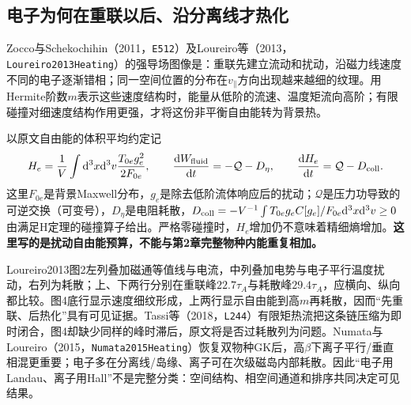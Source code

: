\subsection{电子为何在重联以后、沿分离线才热化}
Zocco与Schekochihin（2011，\texttt{E512}）及Loureiro等（2013，\texttt{Loureiro2013Heating}）的强导场图像是：重联先建立流动和扰动，沿磁力线速度不同的电子逐渐错相；同一空间位置的分布在$v_\parallel$方向出现越来越细的纹理。用Hermite阶数$m$表示这些速度结构时，能量从低阶的流速、温度矩流向高阶；有限碰撞对细速度结构作用更强，才将这份非平衡自由能转为背景热。\citep{E512,Loureiro2013Heating}

以原文自由能的体积平均约定记
\begin{equation}
H_e=\frac1V\int\mathrm d^3x\mathrm d^3v\frac{T_{0e}g_e^2}{2F_{0e}},\qquad
\frac{\mathrm d W_{\rm fluid}}{\mathrm d t}=-\mathcal Q-D_\eta,\qquad
\frac{\mathrm d H_e}{\mathrm d t}=\mathcal Q-D_{\rm coll}.
\end{equation}
这里$F_{0e}$是背景Maxwell分布，$g_e$是除去低阶流体响应后的扰动；$\mathcal Q$是压力功导致的可逆交换（可变号），$D_\eta$是电阻耗散，$D_{\rm coll}=-V^{-1}\int T_{0e}g_e C[g_e]/F_{0e}\mathrm d^3x\mathrm d^3v\geq0$由满足H定理的碰撞算子给出。严格零碰撞时，$H_e$增加仍不意味着精细熵增加。\textbf{这里写的是扰动自由能预算，不能与第2章完整物种内能重复相加。}

Loureiro2013图2左列叠加磁通等值线与电流，中列叠加电势与电子平行温度扰动，右列为耗散；上、下两行分别在重联峰$22.7\tau_A$与耗散峰$29.4\tau_A$，应横向、纵向都比较。图4底行显示速度细纹形成，上两行显示自由能到高$m$再耗散，因而“先重联、后热化”具有可见证据。Tassi等（2018，\texttt{L244}）有限矩热流把这条链压缩为即时闭合，图4却缺少同样的峰时滞后，原文将是否过耗散列为问题。Numata与Loureiro（2015，\texttt{Numata2015Heating}）恢复双物种GK后，高$\beta$下离子平行/垂直相混更重要；电子多在分离线/岛缘、离子可在次级磁岛内部耗散。因此“电子用Landau、离子用Hall”不是完整分类：空间结构、相空间通道和排序共同决定可见结果。\citep{L244,Numata2015Heating}
